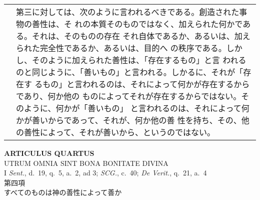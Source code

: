 \documentclass[10pt]{jsarticle} %
\begin{document}
\begin{longtable}{p{21em}p{21em}}
&

第三に対しては、次のように言われるべきである。創造された事物の善性は、そ
 れの本質そのものではなく、加えられた何かである。それは、そのものの存在
 それ自体であるか、あるいは、加えられた完全性であるか、あるいは、目的へ
 の秩序である。しかし、そのように加えられた善性は、「存在するもの」と言
 われるのと同じように、「善いもの」と言われる。しかるに、それが「存在す
 るもの」と言われるのは、それによって何かが存在するからであり、何か他の
 ものによってそれが存在するからではない。そのように、何かが「善いもの」
 と言われるのは、それによって何かが善いからであって、それが、何か他の善
 性を持ち、その、他の善性によって、それが善いから、というのではない。

\end{longtable}
\newpage
{}

\begin{center}
 {\Large {\bf ARTICULUS QUARTUS}}\\
 {\large UTRUM OMNIA SINT BONA BONITATE DIVINA}\\
 {\footnotesize I {\itshape Sent.}, d.~19, q.~5, a.~2, ad 3; {\itshape
 SCG.}, c.~40; {\itshape De Verit.}, q.~21, a.~4}\\
 {\Large 第四項\\すべてのものは神の善性によって善か }
\end{center}
\end{document}
